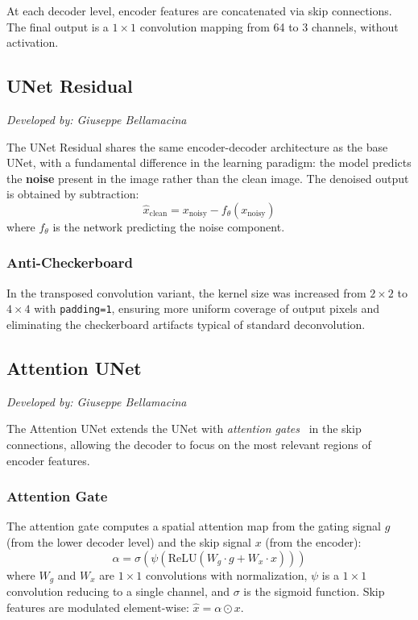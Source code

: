 At each decoder level, encoder features are concatenated via skip connections. The final output is a $1\!\times\!1$ convolution mapping from 64 to 3 channels, without activation.

\subsection{UNet Residual}
\label{subsec:unet-residual}

\textit{Developed by: Giuseppe Bellamacina}

\medskip

The UNet Residual shares the same encoder-decoder architecture as the base UNet, with a fundamental difference in the learning paradigm: the model predicts the \textbf{noise} present in the image rather than the clean image. The denoised output is obtained by subtraction:
\begin{equation}
\hat{x}_{\text{clean}} = x_{\text{noisy}} - f_\theta(x_{\text{noisy}})
\end{equation}
where $f_\theta$ is the network predicting the noise component.

\subsubsection{Anti-Checkerboard}
In the transposed convolution variant, the kernel size was increased from $2\!\times\!2$ to $4\!\times\!4$ with \texttt{padding=1}, ensuring more uniform coverage of output pixels and eliminating the checkerboard artifacts typical of standard deconvolution.

\subsection{Attention UNet}
\label{subsec:attention-unet}

\textit{Developed by: Giuseppe Bellamacina}

\medskip

The Attention UNet extends the UNet with \textit{attention gates}~\cite{attentiongate} in the skip connections, allowing the decoder to focus on the most relevant regions of encoder features.

\subsubsection{Attention Gate}
The attention gate computes a spatial attention map from the gating signal $g$ (from the lower decoder level) and the skip signal $x$ (from the encoder):
\begin{equation}
\alpha = \sigma\!\left(\psi\!\left(\text{ReLU}(W_g \cdot g + W_x \cdot x)\right)\right)
\end{equation}
where $W_g$ and $W_x$ are $1\!\times\!1$ convolutions with normalization, $\psi$ is a $1\!\times\!1$ convolution reducing to a single channel, and $\sigma$ is the sigmoid function. Skip features are modulated element-wise: $\hat{x} = \alpha \odot x$.

